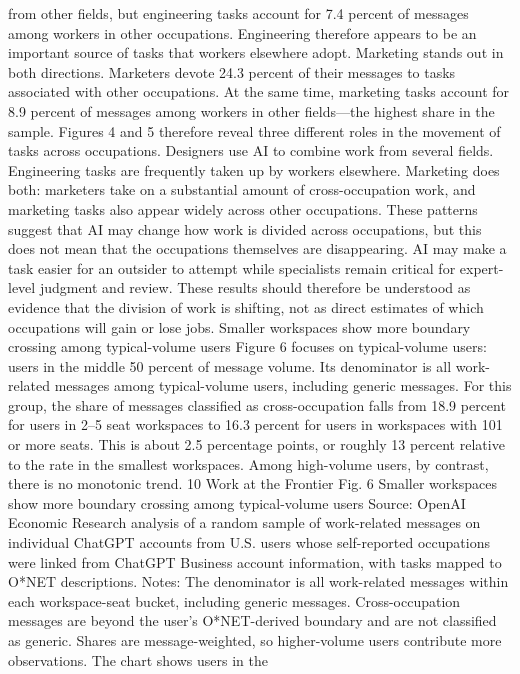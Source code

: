 from other fields, but engineering tasks account for 7.4 percent of messages among workers in other
occupations. Engineering therefore appears to be an important source of tasks that workers elsewhere
adopt.
Marketing stands out in both directions. Marketers devote 24.3 percent of their messages to tasks
associated with other occupations. At the same time, marketing tasks account for 8.9 percent of
messages among workers in other fields—the highest share in the sample.
Figures 4 and 5 therefore reveal three different roles in the movement of tasks across occupations.
Designers use AI to combine work from several fields. Engineering tasks are frequently taken up by
workers elsewhere. Marketing does both: marketers take on a substantial amount of cross-occupation
work, and marketing tasks also appear widely across other occupations.
These patterns suggest that AI may change how work is divided across occupations, but this does not
mean that the occupations themselves are disappearing. AI may make a task easier for an outsider
to attempt while specialists remain critical for expert-level judgment and review. These results should
therefore be understood as evidence that the division of work is shifting, not as direct estimates of which
occupations will gain or lose jobs.
Smaller workspaces show more
boundary crossing among
typical-volume users
Figure 6 focuses on typical-volume users: users in the middle 50 percent of message volume. Its
denominator is all work-related messages among typical-volume users, including generic messages.
For this group, the share of messages classified as cross-occupation falls from 18.9 percent for users
in 2–5 seat workspaces to 16.3 percent for users in workspaces with 101 or more seats. This is about
2.5 percentage points, or roughly 13 percent relative to the rate in the smallest workspaces. Among
high-volume users, by contrast, there is no monotonic trend.
10
Work at the Frontier
Fig. 6
Smaller workspaces show more boundary crossing among typical-volume users
Source: OpenAI Economic Research analysis of a random sample of work-related messages on individual ChatGPT accounts
from U.S. users whose self-reported occupations were linked from ChatGPT Business account information, with tasks mapped
to O*NET descriptions. Notes: The denominator is all work-related messages within each workspace-seat bucket, including
generic messages. Cross-occupation messages are beyond the user’s O*NET-derived boundary and are not classified as
generic. Shares are message-weighted, so higher-volume users contribute more observations. The chart shows users in the
